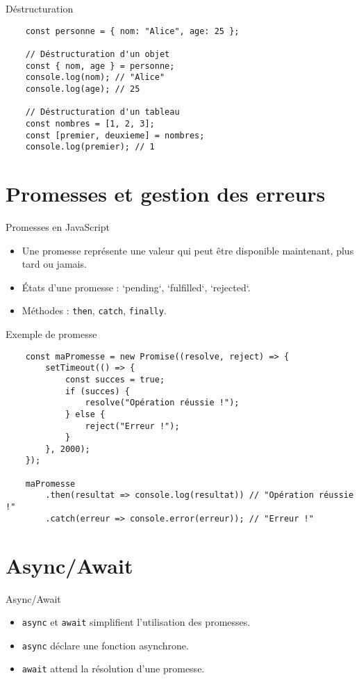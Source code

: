 \documentclass{beamer}
\begin{document}
    \begin{frame}[fragile]{Déstructuration}
    \begin{verbatim}
    const personne = { nom: "Alice", age: 25 };
    
    // Déstructuration d'un objet
    const { nom, age } = personne;
    console.log(nom); // "Alice"
    console.log(age); // 25
    
    // Déstructuration d'un tableau
    const nombres = [1, 2, 3];
    const [premier, deuxieme] = nombres;
    console.log(premier); // 1
    \end{verbatim}
    \end{frame}
    
    \section{Promesses et gestion des erreurs}
    \begin{frame}{Promesses en JavaScript}
    \begin{itemize}
        \item Une promesse représente une valeur qui peut être disponible maintenant, plus tard ou jamais.
        \item États d'une promesse : `pending`, `fulfilled`, `rejected`.
        \item Méthodes : \texttt{then}, \texttt{catch}, \texttt{finally}.
    \end{itemize}
    \end{frame}
    
    \begin{frame}[fragile]{Exemple de promesse}
    \begin{verbatim}
    const maPromesse = new Promise((resolve, reject) => {
        setTimeout(() => {
            const succes = true;
            if (succes) {
                resolve("Opération réussie !");
            } else {
                reject("Erreur !");
            }
        }, 2000);
    });
    
    maPromesse
        .then(resultat => console.log(resultat)) // "Opération réussie !"
        .catch(erreur => console.error(erreur)); // "Erreur !"
    \end{verbatim}
    \end{frame}
    
    \section{Async/Await}
    \begin{frame}{Async/Await}
    \begin{itemize}
        \item \texttt{async} et \texttt{await} simplifient l'utilisation des promesses.
        \item \texttt{async} déclare une fonction asynchrone.
        \item \texttt{await} attend la résolution d'une promesse.
    \end{itemize}
    \end{frame}
    
\end{document}
